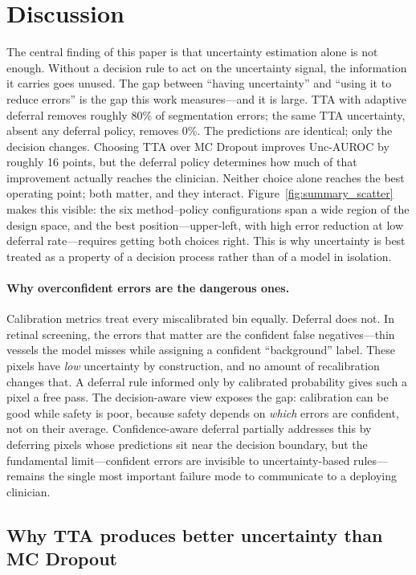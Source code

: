 \section{Discussion}
\label{sec:discussion}

The central finding of this paper is that uncertainty estimation alone is
not enough. Without a decision rule to act on the uncertainty signal, the
information it carries goes unused. The gap between ``having uncertainty''
and ``using it to reduce errors'' is the gap this work measures---and it
is large. TTA with adaptive deferral removes roughly 80\% of segmentation
errors; the same TTA uncertainty, absent any deferral policy, removes 0\%.
The predictions are identical; only the decision changes. Choosing TTA
over MC Dropout improves Unc-AUROC by roughly 16 points, but the deferral
policy determines how much of that improvement actually reaches the
clinician. Neither choice alone reaches the best operating point; both
matter, and they interact. Figure~\ref{fig:summary_scatter} makes this
visible: the six method--policy configurations span a wide region of the
design space, and the best position---upper-left, with high error
reduction at low deferral rate---requires getting both choices right.
This is why uncertainty is best treated as a property of a decision
process rather than of a model in isolation.

\paragraph{Why overconfident errors are the dangerous ones.} Calibration
metrics treat every miscalibrated bin equally. Deferral does not. In
retinal screening, the errors that matter are the confident
false negatives---thin vessels the model misses while assigning a
confident ``background'' label. These pixels have \emph{low} uncertainty
by construction, and no amount of recalibration changes that. A deferral
rule informed only by calibrated probability gives such a pixel a free
pass. The decision-aware view exposes the gap: calibration can be good
while safety is poor, because safety depends on \emph{which} errors are
confident, not on their average. Confidence-aware deferral partially
addresses this by deferring pixels whose predictions sit near the
decision boundary, but the fundamental limit---confident errors are
invisible to uncertainty-based rules---remains the single most important
failure mode to communicate to a deploying clinician.

\subsection{Why TTA produces better uncertainty than MC Dropout}


